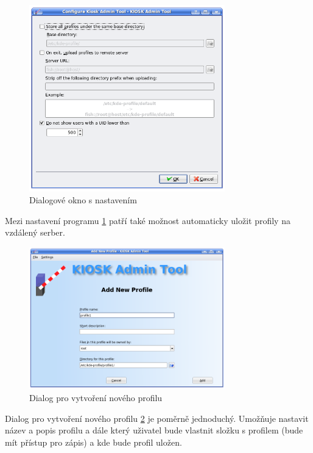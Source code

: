 \begin{figure}[h]
    \centering
    \includegraphics[width=8.5cm]{obrazky/KioskToolKDE3/nastaveni.png}
    \caption{Dialogové okno s nastavením}
    \label{fig:kt3_nastaveni}
\end{figure}
Mezi nastavení programu \ref{fig:kt3_nastaveni} patří také možnost automaticky
uložit profily na vzdálený serber.

\begin{figure}[h]
    \centering
    \includegraphics[width=8.5cm]{obrazky/KioskToolKDE3/novy_profil.png}
    \caption{Dialog pro vytvoření nového profilu}
    \label{fig:kt3_novyprofil}
\end{figure}
Dialog pro vytvoření nového profilu \ref{fig:kt3_novyprofil} je poměrně
jednoduchý. Umožňuje nastavit název a popis profilu a dále který uživatel bude
vlastnit složku s profilem (bude mít přístup pro zápis) a kde bude profil
uložen.

